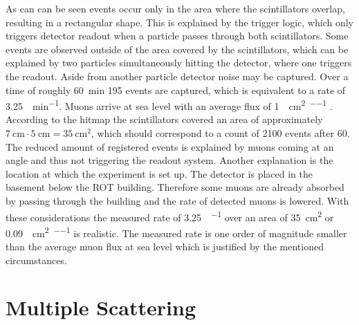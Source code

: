 \documentclass[sn-mathphys-num,iicol]{sn-jnl}
\theoremstyle{thmstyleone}
\theoremstyle{thmstyletwo}
\theoremstyle{thmstylethree}
\begin{document}
As can can be seen events occur only in the area where the scintillators overlap, resulting in a rectangular shape.
This is explained by the trigger logic, which only triggers detector readout when a particle passes through both scintillators.
Some events are observed outside of the area covered by the scintillators, which can be explained by two particles simultaneously hitting the detector, where one triggers the readout.
Aside from another particle detector noise may be captured.
Over a time of roughly \SI{60}{\minute} 195 events are captured, which is equivalent to a rate of \SI{3.25}{\per\minute}.
Muons arrive at sea level with an average flux of \SI{1}{\per\centi\meter\squared\per\min} \cite{muon}.
According to the hitmap the scintillators covered an area of approximately $\SI{7}{\centi\meter}\cdot\SI{5}{\centi\meter}=\SI{35}{\centi\meter\squared}$, which should correspond to a count of 2100 events after \SI{60}{\min}.
The reduced amount of registered events is explained by muons coming at an angle and thus not triggering the readout system.
Another explanation is the location at which the experiment is set up. 
The detector is placed in the basement below the ROT building. 
Therefore some muons are already absorbed by passing through the building and the rate of detected muons is lowered.
With these considerations the measured rate of \SI{3.25}{\per\min} over an area of \SI{35}{\centi\meter\squared} or \SI{0.09}{\per\centi\meter\squared\per\min} is realistic.
The measured rate is one order of magnitude smaller than the average muon flux at sea level \cite{muonsea} which is justified by the mentioned circumstances. 


\section{Multiple Scattering}
\end{document}
